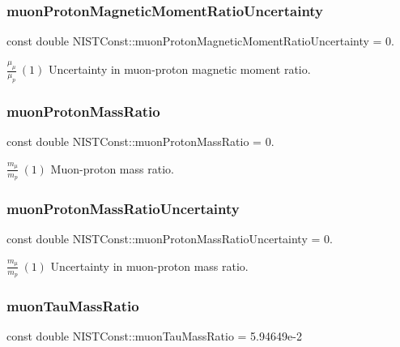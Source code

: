 \subsubsection{\texorpdfstring{muon\+Proton\+Magnetic\+Moment\+Ratio\+Uncertainty}{muonProtonMagneticMomentRatioUncertainty}}
{\footnotesize\ttfamily const double N\+I\+S\+T\+Const\+::muon\+Proton\+Magnetic\+Moment\+Ratio\+Uncertainty = 0.}

$\frac{\mu_\mu}{\mu_p} \ (1)$ Uncertainty in muon-\/proton magnetic moment ratio. \mbox{\label{group___n_i_s_t_const-_muon_ga72ca5408215ae40bb36ef1bff9107cf7}} 
\subsubsection{\texorpdfstring{muon\+Proton\+Mass\+Ratio}{muonProtonMassRatio}}
{\footnotesize\ttfamily const double N\+I\+S\+T\+Const\+::muon\+Proton\+Mass\+Ratio = 0.}

$\frac{m_\mu}{m_p} \ (1)$ Muon-\/proton mass ratio. \mbox{\label{group___n_i_s_t_const-_muon_ga61cddfc40a08640b83041efd9d4dbbe2}} 
\subsubsection{\texorpdfstring{muon\+Proton\+Mass\+Ratio\+Uncertainty}{muonProtonMassRatioUncertainty}}
{\footnotesize\ttfamily const double N\+I\+S\+T\+Const\+::muon\+Proton\+Mass\+Ratio\+Uncertainty = 0.}

$\frac{m_\mu}{m_p} \ (1)$ Uncertainty in muon-\/proton mass ratio. \mbox{\label{group___n_i_s_t_const-_muon_gaaf24aa0c43f6d4a1935963fdd4c44789}} 
\subsubsection{\texorpdfstring{muon\+Tau\+Mass\+Ratio}{muonTauMassRatio}}
{\footnotesize\ttfamily const double N\+I\+S\+T\+Const\+::muon\+Tau\+Mass\+Ratio = 5.\+94649e-\/2}

